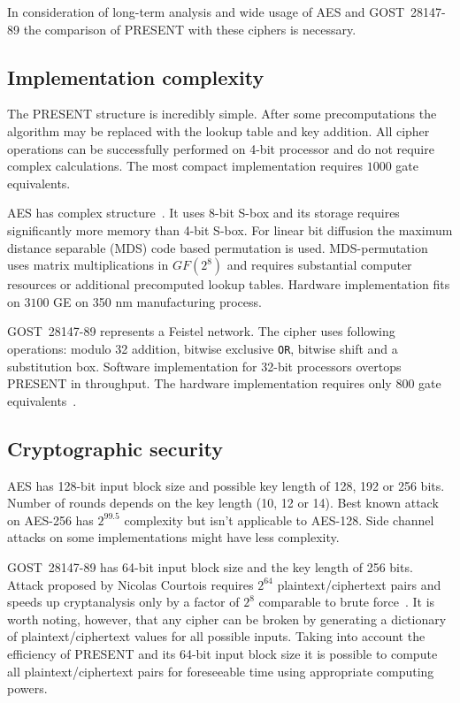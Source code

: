 In consideration of long-term analysis and wide usage of AES and
GOST~28147-89 the comparison of PRESENT with these ciphers is
necessary.

\subsection{Implementation complexity}

The PRESENT structure is incredibly simple. After some precomputations
the algorithm may be replaced with the lookup table and key addition. All cipher
operations can be successfully performed on 4-bit processor and do not require
complex calculations. The most compact implementation requires $ 1000 $ gate
equivalents.

AES has complex structure~\cite{daemen:rijndael}. It uses 8-bit S-box and
its storage requires significantly more memory than 4-bit S-box. For linear bit
diffusion the maximum distance separable (MDS) code based permutation is used.
MDS-permutation uses matrix multiplications in $ GF(2^8) $ and requires
substantial computer resources or additional precomputed lookup tables. Hardware
implementation fits on $ 3100 $ GE on 350 nm manufacturing process.

GOST~28147-89 represents a Feistel network. The cipher uses following
operations: modulo 32 addition, bitwise exclusive \verb+OR+, bitwise shift and a
substitution box. Software implementation for 32-bit processors overtops
PRESENT in throughput. The hardware implementation requires only $ 800 $
gate equivalents~\cite{poschmann:gost}.

\subsection{Cryptographic security}

AES has 128-bit input block size and possible key length of 128, 192 or
256 bits. Number of rounds depends on the key length (10, 12 or 14). Best known
attack on AES-256 has $ 2^{99.5} $ complexity but isn't applicable to
AES-128. Side channel attacks on some implementations might have less
complexity.

GOST~28147-89 has 64-bit input block size and the key length of 256 bits. 
Attack proposed by Nicolas Courtois requires $ 2^{64} $
\mbox{plaintext/ciphertext} pairs and speeds up cryptanalysis only by a factor
of $ 2^8 $ comparable to brute force~\cite{Courtois:cryptoeprint_2011}. It is worth noting,
however, that any cipher can be broken by generating a dictionary of
\mbox{plaintext/ciphertext} values for all possible inputs. Taking into account
the efficiency of PRESENT and its 64-bit input block size it is possible
to compute all \mbox{plaintext/ciphertext} pairs for foreseeable time using
appropriate computing powers.

